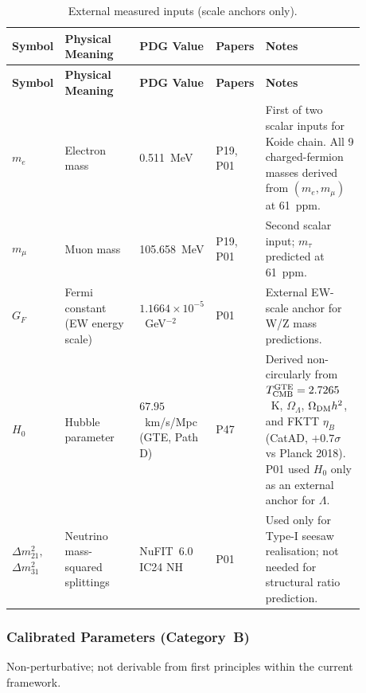 \begingroup\footnotesize\renewcommand{\arraystretch}{1.2}
\begin{longtable}{@{}P{0.10\linewidth}P{0.21\linewidth}P{0.18\linewidth}P{0.10\linewidth}P{0.29\linewidth}@{}}
\caption{External measured inputs (scale anchors only).}
\label{tab:mi-external-inputs}\\
\toprule
\textbf{Symbol} & \textbf{Physical Meaning} & \textbf{PDG Value} &
  \textbf{Papers} & \textbf{Notes} \\
\midrule
\endfirsthead
\midrule
\textbf{Symbol} & \textbf{Physical Meaning} & \textbf{PDG Value} &
  \textbf{Papers} & \textbf{Notes} \\
\midrule
\endhead
\bottomrule
\endfoot
$m_e$ & Electron mass & 0.511~MeV & P19, P01 &
  First of two scalar inputs for Koide chain.
  All 9 charged-fermion masses derived from $(m_e, m_\mu)$ at 61~ppm. \\
$m_\mu$ & Muon mass & 105.658~MeV & P19, P01 &
  Second scalar input; $m_\tau$ predicted at 61~ppm. \\
$G_F$ & Fermi constant (EW energy scale) & $1.1664\times10^{-5}$~GeV$^{-2}$ & P01 &
  External EW-scale anchor for W/Z mass predictions. \\
$H_0$ & Hubble parameter & $67.95$~km/s/Mpc (GTE, Path D) & P47 &
  Derived non-circularly from $T_{\rm CMB}^{\rm GTE}=2.7265$~K, $\Omega_\Lambda$,
  $\Omega_{\rm DM}h^2$, and FKTT $\eta_B$ (CatAD, $+0.7\sigma$ vs Planck 2018).
  P01 used $H_0$ only as an external anchor for $\Lambda$. \\
$\Delta m^2_{21},$\newline$\Delta m^2_{31}$ & Neutrino mass-squared splittings & NuFIT~6.0 IC24 NH & P01 &
  Used only for Type-I seesaw realisation; not needed for structural ratio prediction. \\
\end{longtable}
\endgroup

\subsubsection{Calibrated Parameters (Category~B)}
\label{sec:mi-calibrated}

Non-perturbative; not derivable from first principles within the current framework.

